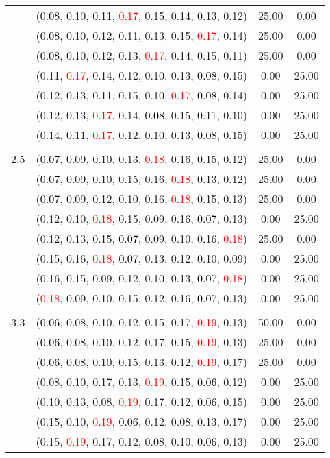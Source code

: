 \documentclass[10pt,a4paper]{report}
\begin{document}
\begin{center}
\begin{longtable}{clcc}
			&(\textcolor{black}{0.08}, 0.10, 0.11, \textcolor{red}{0.17}, 0.15, 0.14, 0.13, 0.12)&25.00&0.00\\
			&(\textcolor{black}{0.08}, 0.10, 0.12, 0.11, 0.13, 0.15, \textcolor{red}{0.17}, 0.14)&25.00&0.00\\
			&(\textcolor{black}{0.08}, 0.10, 0.12, 0.13, \textcolor{red}{0.17}, 0.14, 0.15, 0.11)&25.00&0.00\\
			&(0.11, \textcolor{red}{0.17}, 0.14, 0.12, 0.10, 0.13, \textcolor{black}{0.08}, 0.15)&0.00&25.00\\
			&(0.12, 0.13, 0.11, 0.15, 0.10, \textcolor{red}{0.17}, \textcolor{black}{0.08}, 0.14)&0.00&25.00\\
			&(0.12, 0.13, \textcolor{red}{0.17}, 0.14, \textcolor{black}{0.08}, 0.15, 0.11, 0.10)&0.00&25.00\\
			&(0.14, 0.11, \textcolor{red}{0.17}, 0.12, 0.10, 0.13, \textcolor{black}{0.08}, 0.15)&0.00&25.00\\
		&&&\\
		2.5			&(\textcolor{black}{0.07}, 0.09, 0.10, 0.13, \textcolor{red}{0.18}, 0.16, 0.15, 0.12)&25.00&0.00\\
			&(\textcolor{black}{0.07}, 0.09, 0.10, 0.15, 0.16, \textcolor{red}{0.18}, 0.13, 0.12)&25.00&0.00\\
			&(\textcolor{black}{0.07}, 0.09, 0.12, 0.10, 0.16, \textcolor{red}{0.18}, 0.15, 0.13)&25.00&0.00\\
			&(0.12, 0.10, \textcolor{red}{0.18}, 0.15, 0.09, 0.16, \textcolor{black}{0.07}, 0.13)&0.00&25.00\\
			&(0.12, 0.13, 0.15, \textcolor{black}{0.07}, 0.09, 0.10, 0.16, \textcolor{red}{0.18})&25.00&0.00\\
			&(0.15, 0.16, \textcolor{red}{0.18}, \textcolor{black}{0.07}, 0.13, 0.12, 0.10, 0.09)&0.00&25.00\\
			&(0.16, 0.15, 0.09, 0.12, 0.10, 0.13, \textcolor{black}{0.07}, \textcolor{red}{0.18})&0.00&25.00\\
			&(\textcolor{red}{0.18}, 0.09, 0.10, 0.15, 0.12, 0.16, \textcolor{black}{0.07}, 0.13)&0.00&25.00\\
		&&&\\
		3.3			&(\textcolor{black}{0.06}, 0.08, 0.10, 0.12, 0.15, 0.17, \textcolor{red}{0.19}, 0.13)&50.00&0.00\\
			&(\textcolor{black}{0.06}, 0.08, 0.10, 0.12, 0.17, 0.15, \textcolor{red}{0.19}, 0.13)&25.00&0.00\\
			&(\textcolor{black}{0.06}, 0.08, 0.10, 0.15, 0.13, 0.12, \textcolor{red}{0.19}, 0.17)&25.00&0.00\\
			&(0.08, 0.10, 0.17, 0.13, \textcolor{red}{0.19}, 0.15, \textcolor{black}{0.06}, 0.12)&0.00&25.00\\
			&(0.10, 0.13, 0.08, \textcolor{red}{0.19}, 0.17, 0.12, \textcolor{black}{0.06}, 0.15)&0.00&25.00\\
			&(0.15, 0.10, \textcolor{red}{0.19}, \textcolor{black}{0.06}, 0.12, 0.08, 0.13, 0.17)&0.00&25.00\\
			&(0.15, \textcolor{red}{0.19}, 0.17, 0.12, 0.08, 0.10, \textcolor{black}{0.06}, 0.13)&0.00&25.00\\
		\bottomrule
	\end{longtable}
\end{center}
\newpage
\end{document}
